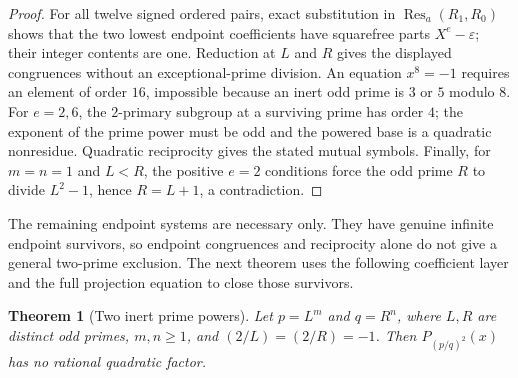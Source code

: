 \documentclass[11pt]{article}
\newtheorem{theorem}{Theorem}
\begin{document}
\begin{proof}
For all twelve signed ordered pairs, exact substitution in
$\operatorname{Res}_a(R_1,R_0)$ shows that the two lowest endpoint
coefficients have squarefree parts $X^e-\varepsilon$; their integer contents
are one.  Reduction at $L$ and $R$ gives the displayed congruences without an
exceptional-prime division.  An equation $x^8=-1$ requires an element of
order $16$, impossible because an inert odd prime is $3$ or $5$ modulo $8$.
For $e=2,6$, the $2$-primary subgroup at a surviving prime has order $4$;
the exponent of the prime power must be odd and the powered base is a
quadratic nonresidue.  Quadratic reciprocity gives the stated mutual symbols.
Finally, for $m=n=1$ and $L<R$, the positive $e=2$ conditions force the odd
prime $R$ to divide $L^2-1$, hence $R=L+1$, a contradiction.
\end{proof}

The remaining endpoint systems are necessary only.  They have genuine
infinite endpoint survivors, so endpoint congruences and reciprocity alone do
not give a general two-prime exclusion.  The next theorem uses the following
coefficient layer and the full projection equation to close those survivors.

\begin{theorem}[Two inert prime powers]
Let $p=L^m$ and $q=R^n$, where $L,R$ are distinct odd primes,
$m,n\geq1$, and $(2/L)=(2/R)=-1$.  Then $P_{(p/q)^2}(x)$ has no rational
quadratic factor.
\end{theorem}
\end{document}
